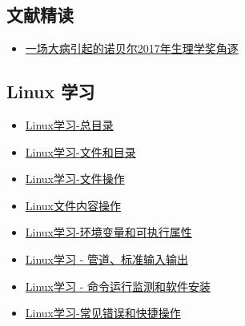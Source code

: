 \documentclass[]{article}
\providecommand{\tightlist}{%
  \setlength{\itemsep}{0pt}\setlength{\parskip}{0pt}}
\numberwithin{figure}{section}
\numberwithin{table}{section}
\theoremstyle{definition}
\theoremstyle{definition}
\theoremstyle{definition}
\theoremstyle{remark}
\begin{document}
\subsection{文献精读}

\begin{itemize}
\tightlist
\item
  \href{http://mp.weixin.qq.com/s/T9Q6CUCt-wBoUCEwSBZALg}{一场大病引起的诺贝尔2017年生理学奖角逐}
\end{itemize}

\subsection{Linux 学习}\label{linux-}

\begin{itemize}
\tightlist
\item
  \href{http://mp.weixin.qq.com/s?__biz=MzI5MTcwNjA4NQ==\&mid=2247484606\&idx=1\&sn=c5f2654e3ede87f534bc352f286a6357\&chksm=ec0dc134db7a48228044e720eff4cc39ea2b9258db7d20faafbcae29a47ef7de334678fad35a\#rd}{Linux学习-总目录}
\item
  \href{http://mp.weixin.qq.com/s/yKP1Kboji9N4p2Sl1Ovj0Q}{Linux学习-文件和目录}
\item
  \href{http://mp.weixin.qq.com/s/4bYMzJclf_xHpqdrlbvAdA}{Linux学习-文件操作}
\item
  \href{http://mp.weixin.qq.com/s/QFgINAYcQA9kYYSA28wK-Q}{Linux文件内容操作}
\item
  \href{http://mp.weixin.qq.com/s?__biz=MzI5MTcwNjA4NQ==\&mid=2247483872\&idx=1\&sn=7fb7e57b3ff5c06ebaff344370c8b4c8\&chksm=ec0dc46adb7a4d7cc125ab3cf8361bf3e3fcf858edca7d7987d52bce3e9e3aa0b7d8f8f2adfa\#rd}{Linux学习-环境变量和可执行属性}
\item
  \href{http://mp.weixin.qq.com/s?__biz=MzI5MTcwNjA4NQ==\&mid=2247483923\&idx=1\&sn=eb764e59cfc12b98e3eb4240ac350330\&chksm=ec0dc799db7a4e8f9dc3a64760253a554d3241446005040ad721070bafb237f405b173c11ef4\#rd}{Linux学习
  - 管道、标准输入输出}
\item
  \href{http://mp.weixin.qq.com/s?__biz=MzI5MTcwNjA4NQ==\&mid=2247483954\&idx=1\&sn=11247591a6ef98a4d25404278d577ed0\&chksm=ec0dc7b8db7a4eaeb7ae3fd2fa2fbfa7bfd13f5e90d7a42d405f6f8e8783761de048f7ccbc58\#rd}{Linux学习
  - 命令运行监测和软件安装}
\item
  \href{http://mp.weixin.qq.com/s?__biz=MzI5MTcwNjA4NQ==\&mid=2247483873\&idx=1\&sn=6e2b9ddb6ba61c49d834bcfba6703c5c\&chksm=ec0dc46bdb7a4d7d6d1232390f6f8843607b37ecca7938d19c20404dff0cf01aebfff77a0cdd\#rd}{Linux学习-常见错误和快捷操作}

\end{itemize}
\end{document}
